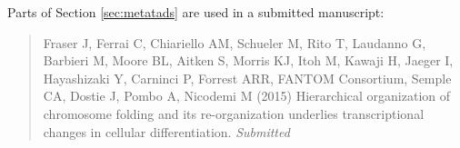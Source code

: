 \documentclass[a4paper,11pt,twoside,toc=listof]{scrbook}
\begin{document}
{\flushleft Parts of Section \ref{sec:metatads} are used in a submitted manuscript:}

\begin{quote}
Fraser J, Ferrai C, Chiariello AM, Schueler M, Rito T, Laudanno G, Barbieri M, Moore BL, Aitken S,
Morris KJ, Itoh M, Kawaji H, Jaeger I, Hayashizaki Y, Carninci P, Forrest ARR, FANTOM Consortium, Semple CA, Dostie J, Pombo A, Nicodemi M (2015) Hierarchical organization
of chromosome folding and its re-organization underlies transcriptional
changes in cellular differentiation. \emph{Submitted}
\end{quote}

\clearpage

\mainmatter











%





\backmatter




\end{document}
